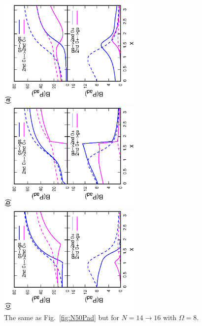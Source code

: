 \documentclass[11pt]{book} %
\begin{document}
\begin{figure}[t]
 \begin{minipage}{0.3\hsize}
 \begin{center}
 \includegraphics[width=70mm,angle=-90]{images/N16Pad_CQ.eps}
 \end{center}
 \captionsetup{labelformat=empty,labelsep=none}
 \end{minipage}
 \begin{minipage}{0.3\hsize}
 \begin{center}
 \includegraphics[width=70mm,angle=-90]{images/N16Pad_FD.eps}
 \end{center}
 \captionsetup{labelformat=empty,labelsep=none}
 \end{minipage}
 \begin{minipage}{0.3\hsize}
 \begin{center}
 \includegraphics[width=70mm,angle=-90]{images/N16Pad_SPA.eps}
 \end{center}
 \captionsetup{labelformat=empty,labelsep=none}
 \end{minipage}
	\caption{The same as Fig.~\ref{fig:N50Pad} but for $N=14\rightarrow 16$
	with $\Omega=8$.
}
 \label{fig:N16Pad}
\end{figure}
\end{document}
